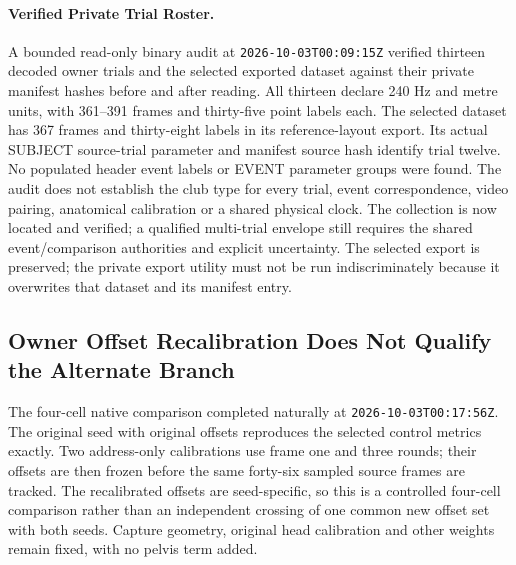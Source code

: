 \documentclass[11pt,a4paper]{article}
\begin{document}
\paragraph{Verified Private Trial Roster.}
A bounded read-only binary audit at \texttt{2026-10-03T00:09:15Z}
verified thirteen decoded owner trials and the selected exported dataset
against their private manifest hashes before and after reading. All
thirteen declare 240 Hz and metre units, with 361--391 frames and
thirty-five point labels each. The selected dataset has 367 frames and
thirty-eight labels in its reference-layout export. Its actual SUBJECT
source-trial parameter and manifest source hash identify trial twelve.
No populated header event labels or EVENT parameter groups were found.
The audit does not establish the club type for every trial, event
correspondence, video pairing, anatomical calibration or a shared
physical clock. The collection is now located and verified; a qualified
multi-trial envelope still requires the shared event/comparison
authorities and explicit uncertainty. The selected export is preserved;
the private export utility must not be run indiscriminately because it
overwrites that dataset and its manifest entry.

\subsection{Owner Offset Recalibration Does Not Qualify the Alternate Branch}
The four-cell native comparison completed naturally at
\texttt{2026-10-03T00:17:56Z}. The original seed with original offsets
reproduces the selected control metrics exactly. Two address-only
calibrations use frame one and three rounds; their offsets are then
frozen before the same forty-six sampled source frames are tracked.
The recalibrated offsets are seed-specific, so this is a controlled
four-cell comparison rather than an independent crossing of one common
new offset set with both seeds. Capture geometry, original head
calibration and other weights remain fixed, with no pelvis term added.
\end{document}
